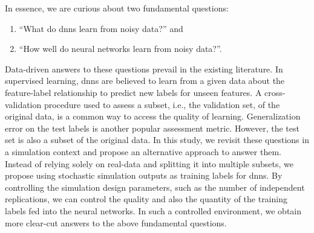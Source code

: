 In essence, we are curious about two fundamental questions:
\begin{enumerate}
    \item ``What do \gls{dnn}s learn from noisy data?'' and 
    \item ``How well do neural networks learn from noisy data?''.
\end{enumerate}
Data-driven answers to these questions prevail in the existing literature.
In supervised learning, \gls{dnn}s are believed to learn from a given data about the feature-label relationship to predict new labels for unseen features.
A cross-validation procedure used to assess a subset, i.e., the validation set, of the original data, is a common way to access the quality of learning.
Generalization error on the test labels is another popular assessment metric.
However, the test set is also a subset of the original data.
In this study, we revisit these questions in a simulation context and propose an alternative approach to answer them.
Instead of relying solely on real-data and splitting it into multiple subsets, we propose using stochastic simulation outputs as training labels for \gls{dnn}s.
By controlling the simulation design parameters, such as the number of independent replications, we can control the quality and also the quantity of the training labels fed into the neural networks.
In such a controlled environment, we obtain more clear-cut answers to the above fundamental questions.


